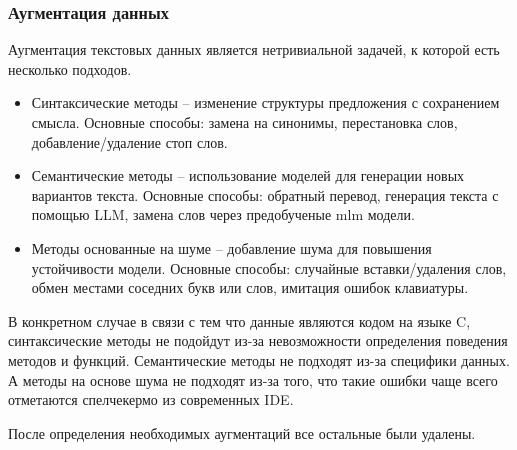 \documentclass[../part_2.tex]{subfiles}
\begin{document}
    \subsubsection{Аугментация данных}
    \par Аугментация текстовых данных является нетривиальной задачей, к которой есть несколько подходов.
    \begin{itemize}
        \item Синтаксические методы -- изменение структуры предложения с сохранением смысла. Основные способы: замена на синонимы, перестановка слов, добавление/удаление стоп слов.
        \item Семантические методы -- использование моделей для генерации новых вариантов текста. Основные способы: обратный перевод, генерация текста с помощью LLM, замена слов через предобученые \acrshort{mlm} модели.
        \item Методы основанные на шуме -- добавление шума для повышения устойчивости модели. Основные способы: случайные вставки/удаления слов, обмен местами соседних букв или слов, имитация ошибок клавиатуры.
    \end{itemize}
    \par В конкретном случае в связи с тем что данные являются кодом на языке C, синтаксические методы не подойдут из-за невозможности определения поведения методов и функций. Семантические методы не подходят из-за специфики данных. А методы на основе шума не подходят из-за того, что такие ошибки чаще всего отметаются спелчекермо из современных IDE.
    \par После определения необходимых аугментаций все остальные были удалены.
\end{document}

